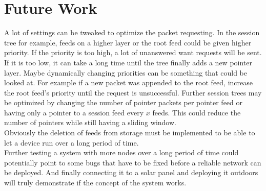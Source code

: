 \section{Future Work}
\label{sec:futurework}
A lot of settings can be tweaked to optimize the packet requesting. In the session tree for example, feeds on a higher layer or the root feed could be given higher priority. If the priority is too high, a lot of unanswered want requests will be sent. If it is too low, it can take a long time until the tree finally adds a new pointer layer. Maybe dynamically changing priorities can be something that could be looked at. For example if a new packet was appended to the root feed, increase the root feed's priority until the request is unsuccessful. Further session trees may be optimized by changing the number of pointer packets per pointer feed or having only a pointer to a session feed every $x$ feeds. This could reduce the number of pointers while still having a sliding window. \\
Obviously the deletion of feeds from storage must be implemented to be able to let a device run over a long period of time. \\
Further testing a system with more nodes over a long period of time could potentially point to some bugs that have to be fixed before a reliable network can be deployed. And finally connecting it to a solar panel and deploying it outdoors will truly demonstrate if the concept of the system works. \\